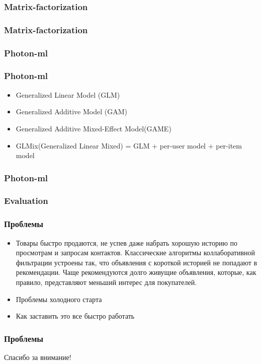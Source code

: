\documentclass[14pt]{beamer}
\begin{document}
		\begin{frame}
			\frametitle{Matrix-factorization}

		\end{frame}
		
		\begin{frame}
			\frametitle{Matrix-factorization}

		\end{frame}
		
		\begin{frame}
			\frametitle{Photon-ml}

		\end{frame}
		
		\begin{frame}
			\frametitle{Photon-ml}
			\begin{itemize}
				\item Generalized Linear Model (GLM)
				\item Generalized Additive Model (GAM)
				\item Generalized Additive Mixed-Effect Model(GAME)
				\item GLMix(Generalized Linear Mixed) = GLM + per-user model + per-item model
			\end{itemize}
		\end{frame}
		
		
		\begin{frame}
			\frametitle{Photon-ml}

		
		\end{frame}
		
		\begin{frame}
			\frametitle{Evaluation}

		\end{frame}
				
		\begin{frame}
			\frametitle{Проблемы}
			\begin{itemize}
				\item Товары быстро продаются, не успев даже набрать хорошую историю по просмотрам и запросам контактов. Классические алгоритмы коллаборативной фильтрации устроены так, что объявления с короткой историей не попадают в рекомендации. Чаще рекомендуются долго живущие объявления, которые, как правило, представляют меньший интерес для покупателей.
				\item Проблемы холодного старта
				\item Как заставить это все быстро работать
			\end{itemize}
		\end{frame}

		\begin{frame}
		\frametitle{Проблемы}

		\end{frame}

		\begin{frame}
			\begin{center}
				Спасибо за внимание!
			\end{center}
		\end{frame}
		
	
\end{document}
